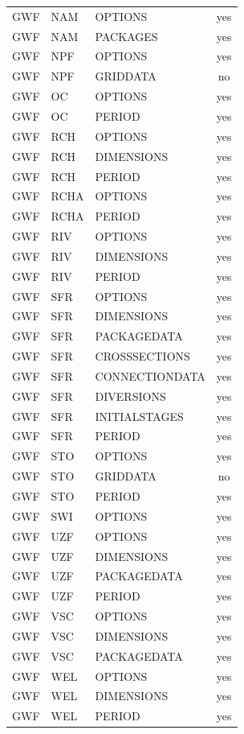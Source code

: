 \begin{longtable}{p{1.5cm} p{1.5cm} p{3cm} c}
\hline
GWF & NAM & OPTIONS & yes \\ 
GWF & NAM & PACKAGES & yes \\ 
\hline
GWF & NPF & OPTIONS & yes \\ 
GWF & NPF & GRIDDATA & no \\ 
\hline
GWF & OC & OPTIONS & yes \\ 
GWF & OC & PERIOD & yes \\ 
\hline
GWF & RCH & OPTIONS & yes \\ 
GWF & RCH & DIMENSIONS & yes \\ 
GWF & RCH & PERIOD & yes \\ 
\hline
GWF & RCHA & OPTIONS & yes \\ 
GWF & RCHA & PERIOD & yes \\ 
\hline
GWF & RIV & OPTIONS & yes \\ 
GWF & RIV & DIMENSIONS & yes \\ 
GWF & RIV & PERIOD & yes \\ 
\hline
GWF & SFR & OPTIONS & yes \\ 
GWF & SFR & DIMENSIONS & yes \\ 
GWF & SFR & PACKAGEDATA & yes \\ 
GWF & SFR & CROSSSECTIONS & yes \\ 
GWF & SFR & CONNECTIONDATA & yes \\ 
GWF & SFR & DIVERSIONS & yes \\ 
GWF & SFR & INITIALSTAGES & yes \\ 
GWF & SFR & PERIOD & yes \\ 
\hline
GWF & STO & OPTIONS & yes \\ 
GWF & STO & GRIDDATA & no \\ 
GWF & STO & PERIOD & yes \\ 
\hline
GWF & SWI & OPTIONS & yes \\ 
\hline
GWF & UZF & OPTIONS & yes \\ 
GWF & UZF & DIMENSIONS & yes \\ 
GWF & UZF & PACKAGEDATA & yes \\ 
GWF & UZF & PERIOD & yes \\ 
\hline
GWF & VSC & OPTIONS & yes \\ 
GWF & VSC & DIMENSIONS & yes \\ 
GWF & VSC & PACKAGEDATA & yes \\ 
\hline
GWF & WEL & OPTIONS & yes \\ 
GWF & WEL & DIMENSIONS & yes \\ 
GWF & WEL & PERIOD & yes \\ 

\end{longtable}
